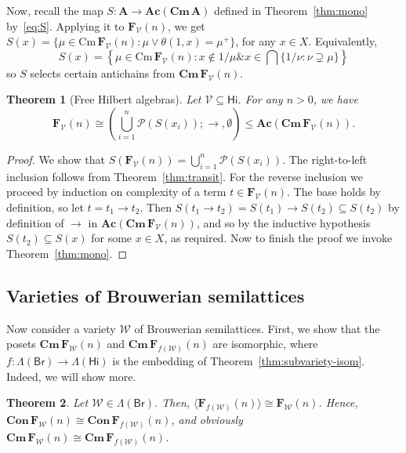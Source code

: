 \documentclass{amsart}
\newtheorem{theorem}{Theorem}[section]
\newcommand{\alg}[1]{\mathbf{#1}}
\newcommand{\var}[1]{\mathsf{#1}}
\newcommand{\FV}{\alg{F}_\mathcal{V}}
\newcommand{\FW}{\alg{F}_\mathcal{W}}
\newcommand{\Con}[1]{\mathbf{Con}\, #1}
\newcommand{\Cm}[1]{\mathbf{Cm}\, #1}
\newcommand{\cm}[1]{\mathrm{Cm}\, #1}
\def\ra{\rightarrow}
\def\pw{\mathscr{P}}
\begin{document}
Now, recall the map $S\colon\alg{A}\to\alg{Ac}(\Cm{\alg{A}})$ defined
in Theorem~\ref{thm:mono} by~\eqref{eq:S}. Applying it to
$\FV(n)$, we get
$S(x) = \{\mu\in\cm{\FV(n)}:\mu\vee\theta(1,x) = \mu^+\}$,
for any $x\in X$. Equivalently,
$$
S(x) = \left\{\mu\in\cm{\FV(n)}: x\notin 1/\mu \mathbin{\&}
x\in \bigcap\{1/\nu: \nu\supsetneq\mu\}\right\}
$$
so $S$ selects certain antichains from $\Cm{\FV(n)}$.


\begin{theorem}[Free Hilbert algebras]\label{thm:free-Hilbert-alg}
Let $\mathcal{V}\subseteq\var{Hi}$. For any $n > 0$, we have
$$
\FV(n)\cong \left(\bigcup_{i=1}^n\pw(S(x_i));\ra,\emptyset\right)
\leq \alg{Ac}(\Cm{\FV}(n)).
$$
\end{theorem}  

\begin{proof}
We show that $S(\FV(n)) =\bigcup_{i=1}^n\pw(S(x_i))$. The 
right-to-left inclusion follows from Theorem~\ref{thm:transit}.
For the reverse inclusion we proceed by induction on complexity of a term
$t\in\FV(n)$. The base holds by definition, so
let $t = t_1\ra t_2$. Then $S(t_1\ra t_2) = S(t_1)\ra S(t_2)\subseteq S(t_2)$ by
definition of $\ra$ in $\alg{Ac}(\Cm{\FV(n)})$, and so by the inductive
hypothesis $S(t_2)\subseteq S(x)$ for some $x\in X$, as required.
Now to finish the proof we invoke Theorem~\ref{thm:mono}.  
\end{proof}


\subsection{Varieties of Brouwerian semilattices}

Now consider a variety $\mathcal{W}$ of Brouwerian semilattices.
First, we show that the posets
$\Cm{\FW}(n)$ and $\Cm{\alg{F}}_{f(\mathcal{W})}(n)$ are isomorphic,
where $f:\Lambda(\var{Br})\to\Lambda(\var{Hi})$ is the embedding of
Theorem~\ref{thm:subvariety-isom}. Indeed, we will show more.


\begin{theorem}\label{thm:same-con}
Let $\mathcal{W}\in\Lambda(\var{Br})$. Then,
$\langle \alg{F}_{f(\mathcal{W})}(n)\rangle \cong
\FW(n)$. Hence, $\Con{\FW}(n)\cong \Con{\alg{F}}_{f(\mathcal{W})}(n)$, and obviously  
$\Cm{\FW}(n)\cong \Cm{\alg{F}}_{f(\mathcal{W})}(n)$.  
\end{theorem}  
\end{document}
